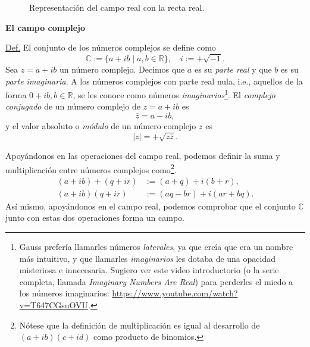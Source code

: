 \documentclass[apuntes]{subfiles}
\begin{document}
\begin{figure}[h!]
    \centering
    \caption{Representación del campo real con la recta real.} 
    \label{fig: Campo real}
\end{figure}


\textbf{El campo complejo}

\begin{tcolorbox}[breakable]
    
    \underline{Def.} El conjunto de los números complejos se define como
\[
\mathbb{C} := \{a+ib\mid a,b\in\mathbb{R}\}, \quad i := +\sqrt{-1}.
\]
\noindent Sea $z=a+ib$ un número complejo. Decimos que $a$ es su \emph{parte real} y que $b$ es su \emph{parte imaginaria}. A los números complejos con parte real nula, i.e., aquellos de la forma $0+ib, b\in\mathbb{R}$, se les conoce como números \emph{imaginarios}\footnote{Gauss prefería llamarles números \emph{laterales}, ya que creía que era un nombre más intuitivo, y que llamarles \emph{imaginarios} les dotaba de una opacidad misteriosa e innecesaria. Sugiero ver este video introductorio (o la serie completa, llamada \emph{Imaginary Numbers Are Real}) para perderles el miedo a los números imaginarios: \url{https://www.youtube.com/watch?v=T647CGsuOVU}.}. El \emph{complejo conjugado} de un número complejo de $z=a+ib$ es
\[
\overline{z} = a-ib,
\]
y el valor absoluto o \emph{módulo} de un número complejo $z$ es
\[
|z| = +\sqrt{z \overline{z}}.
\]
\end{tcolorbox}    

Apoyándonos en las operaciones del campo real, podemos definir la suma y multiplicación entre números complejos como\footnote{Nótese que la definición de multiplicación es igual al desarrollo de $(a+ib)(c+id)$ como producto de binomios.}.
\begin{align*}
    (a+ib)+(q+ir) &:=(a+q) + i(b+r), \\
    (a+ib)(q+ir)  &:= (aq-br) + i(ar+bq).
\end{align*}
 Así mismo, apoyándonos en el campo real, podemos comprobar que el conjunto $\mathbb{C}$ junto con estas dos operaciones forma un campo. 
\end{document}
